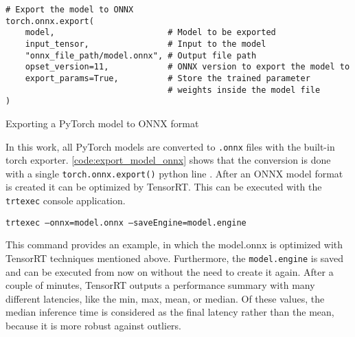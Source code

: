 \begin{listing}[H]
\begin{verbatim}
# Export the model to ONNX
torch.onnx.export(
    model,                       # Model to be exported
    input_tensor,                # Input to the model
    "onnx_file_path/model.onnx", # Output file path
    opset_version=11,            # ONNX version to export the model to
    export_params=True,          # Store the trained parameter
                                 # weights inside the model file
)
\end{verbatim}
\caption{Exporting a PyTorch model to \ac{ONNX} format}
\label{code:export_model_onnx}
\end{listing}

In this work, all PyTorch models are converted to \texttt{.onnx} files with the built-in torch exporter.
\autoref{code:export_model_onnx} shows that the conversion is done with a single \texttt{torch.onnx.export()} python line \cite{pytorch_onnx_exporter_docu}.
After an \ac{ONNX} model format is created it can be optimized by TensorRT.
This can be executed with the \texttt{trtexec} console application.

\vspace{0.5cm}
\begin{center}
    \texttt{trtexec --onnx=model.onnx --saveEngine=model.engine}
\end{center}
\vspace{0.5cm}

This command provides an example, in which the model.onnx is optimized with TensorRT techniques mentioned above.
Furthermore, the \texttt{model.engine} is saved and can be executed from now on without the need to create it again.
After a couple of minutes, TensorRT outputs a performance summary with many different latencies, like the min, max, mean, or median.
Of these values, the median inference time is considered as the final latency rather than the mean, because it is more robust against outliers.